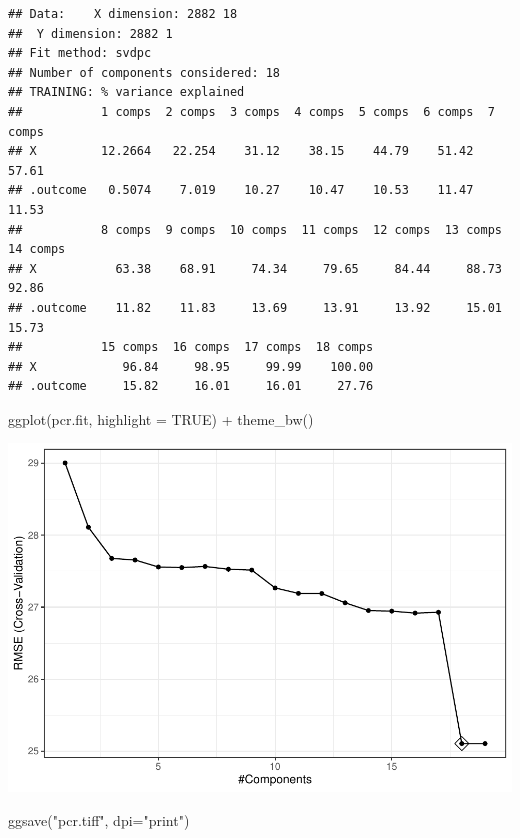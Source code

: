 \documentclass[
]{article}
\newenvironment{Shaded}{\begin{snugshade}}{\end{snugshade}}
\newcommand{\AttributeTok}[1]{\textcolor[rgb]{0.77,0.63,0.00}{#1}}
\newcommand{\ConstantTok}[1]{\textcolor[rgb]{0.00,0.00,0.00}{#1}}
\newcommand{\FunctionTok}[1]{\textcolor[rgb]{0.00,0.00,0.00}{#1}}
\newcommand{\NormalTok}[1]{#1}
\newcommand{\SpecialCharTok}[1]{\textcolor[rgb]{0.00,0.00,0.00}{#1}}
\newcommand{\StringTok}[1]{\textcolor[rgb]{0.31,0.60,0.02}{#1}}
\begin{document}
\begin{verbatim}
## Data:    X dimension: 2882 18 
##  Y dimension: 2882 1
## Fit method: svdpc
## Number of components considered: 18
## TRAINING: % variance explained
##           1 comps  2 comps  3 comps  4 comps  5 comps  6 comps  7 comps
## X         12.2664   22.254    31.12    38.15    44.79    51.42    57.61
## .outcome   0.5074    7.019    10.27    10.47    10.53    11.47    11.53
##           8 comps  9 comps  10 comps  11 comps  12 comps  13 comps  14 comps
## X           63.38    68.91     74.34     79.65     84.44     88.73     92.86
## .outcome    11.82    11.83     13.69     13.91     13.92     15.01     15.73
##           15 comps  16 comps  17 comps  18 comps
## X            96.84     98.95     99.99    100.00
## .outcome     15.82     16.01     16.01     27.76
\end{verbatim}

\begin{Shaded}
\begin{Highlighting}[]
\FunctionTok{ggplot}\NormalTok{(pcr.fit, }\AttributeTok{highlight =} \ConstantTok{TRUE}\NormalTok{) }\SpecialCharTok{+} \FunctionTok{theme\_bw}\NormalTok{()}
\end{Highlighting}
\end{Shaded}

\includegraphics{DSII_final_js5095_files/figure-latex/unnamed-chunk-7-1.pdf}

\begin{Shaded}
\begin{Highlighting}[]
\FunctionTok{ggsave}\NormalTok{(}\StringTok{"pcr.tiff"}\NormalTok{, }\AttributeTok{dpi=}\StringTok{"print"}\NormalTok{)}
\end{Highlighting}
\end{Shaded}
\end{document}
